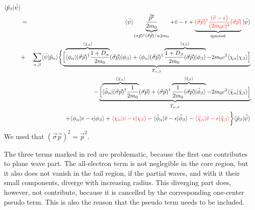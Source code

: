\documentclass[11pt,a4paper]{report}
\begin{document}
\begin{eqnarray}
\langle\tilde{p}_\beta|\tilde{\psi}\rangle
\nonumber\\  %
%
&=&\langle\tilde\psi|
\underbrace{\frac{\hat{\vec{p}}^2}{2m_0}
}_{(\sigma\vec{p})^\dagger(\vec{\sigma}\vec{p})/w2m_0}+\tilde{v}-\epsilon
+
\underbrace{
\textcolor{red}{(\vec{\sigma}\vec{p})^\dagger
\frac{(\tilde{v}-\epsilon)}{(2m_0c)^2}(\vec{\sigma}\vec{p})}}_{\textrm{ignored}}
|\tilde{\psi}\rangle
\nonumber\\
&+&\sum_{\alpha,\beta}\langle\tilde{\psi}|\tilde{p}_\alpha\rangle
\biggl\lbrace
\underbrace{\Bigl[
\overbrace{
\langle\phi_\alpha|(\vec{\sigma}\vec{p})^\dagger
\frac{1+D_\alpha}{2m_0}
}^{\langle\chi_\alpha|}
(\vec{\sigma}\vec{p})|\phi_\beta\rangle
+\langle\phi_\alpha|
(\vec{\sigma}\vec{p})^\dagger
\overbrace{\frac{1+D_\beta}{2m_0}(\vec{\sigma}\vec{p})
|\phi_\beta\rangle}^{|\chi_\beta\rangle}
-2m_0c^2\langle\chi_\alpha|\chi_\beta\rangle\Bigr]}_{T_{\alpha,\beta}}
\nonumber\\
%
&&\hspace{1.5cm}
-\underbrace{\Bigl[
\overbrace{\langle\tilde{\phi}_\alpha|
(\vec{\sigma}\vec{p})^\dagger\frac{1}{2m_0}
}^{\langle\tilde{\chi}_\alpha|}(\vec{\sigma}\vec{p})
+(\vec{\sigma}\vec{p})^\dagger
\overbrace{
\frac{1}{2m_0}(\vec{\sigma}\vec{p})
|\tilde{\phi}_\beta\rangle}^{|\tilde{\chi}_\beta\rangle}
-2m_0c^2\langle\tilde{\chi}_\alpha
|\tilde{\chi}_\beta\rangle\Bigr]}_{\tilde{T}_{\alpha,\beta}}
\nonumber\\
&&\hspace{1.5cm}+\langle\phi_\alpha|v-\epsilon|\phi_\beta\rangle
+\textcolor{red}{\langle\chi_\alpha|v-\epsilon|\chi_\beta\rangle}
-\langle\tilde{\phi}_\alpha|
\tilde{v}-\epsilon|\tilde{\phi}_\beta\rangle
-
\textcolor{red}{
\langle\tilde{\chi}_\alpha|\tilde{v}-\epsilon|\tilde{\chi}_\beta\rangle}
\biggr\rbrace\langle
\tilde{p}_\beta|\tilde{\psi}\rangle
\nonumber\\
\end{eqnarray}
We used that $(\vec{\sigma}\vec{p})^2=\vec{p}^2$.

The three terms marked in red are problematic, because
the first one contributes to plane wave part. The all-electron term is
not neglegible in the core region, but it also does not vanish in the
tail region, if the partial waves, and with it their small components,
diverge with increasing radius. This diverging part does, however, not
contribute, because it is cancelled by the corresponding one-center
pseudo term. This is also the reason that the pseudo term needs to be
included.
\end{document}

